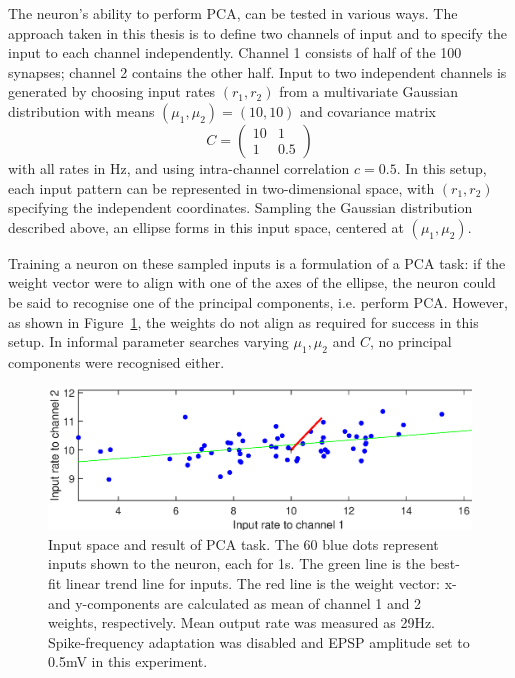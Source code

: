 \documentclass[a4paper,12pt]{report}
\theoremstyle{definition}
\begin{document}
The neuron's ability to perform PCA, can be tested in various ways. The approach taken in this thesis is to define two channels of input and to specify the input to each channel independently. Channel 1 consists of half of the 100 synapses; channel 2 contains the other half. Input to two independent channels is generated by choosing input rates $(r_1, r_2)$ from a multivariate Gaussian distribution with means $(\mu_1, \mu_2)=(10,10)$ and covariance matrix
$$
C =
\begin{pmatrix}
  10 & 1 \\
  1 & 0.5
 \end{pmatrix}
$$
with all rates in Hz, and using intra-channel correlation $c=0.5$. In this setup, each input pattern can be represented in two-dimensional space, with $(r_1, r_2)$ specifying the independent coordinates. Sampling the Gaussian distribution described above, an ellipse forms in this input space, centered at $(\mu_1, \mu_2)$.

Training a neuron on these sampled inputs is a formulation of a PCA task: if the weight vector were to align with one of the axes of the ellipse, the neuron could be said to recognise one of the principal components, i.e. perform PCA. However, as shown in Figure~\ref{fig:exp10_pca}, the weights do not align as required for success in this setup. In informal parameter searches varying $\mu_1, \mu_2$ and $C$, no principal components were recognised either.

\begin{figure}[!htb]
    \centering
    \includegraphics[width=\textwidth]{figures/exp10_pca.eps}
    \caption{Input space and result of PCA task. The 60 blue dots represent inputs shown to the neuron, each for 1s. The green line is the best-fit linear trend line for inputs. The red line is the weight vector: x- and y-components are calculated as mean of channel 1 and 2 weights, respectively. Mean output rate was measured as 29Hz. Spike-frequency adaptation was disabled and EPSP amplitude set to 0.5mV in this experiment.}
    \label{fig:exp10_pca}
\end{figure}
\end{document}
